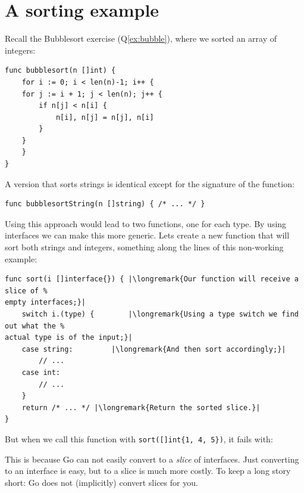 \section{A sorting example}
\label{sec:a sorting example}
Recall the Bubblesort exercise (Q\ref{ex:bubble}), where we sorted an
array of integers:
\begin{lstlisting}
func bubblesort(n []int) {
    for i := 0; i < len(n)-1; i++ {
	for j := i + 1; j < len(n); j++ {
	    if n[j] < n[i] {
		    n[i], n[j] = n[j], n[i]
	    }
	}
    }
}
\end{lstlisting}
A version that sorts strings is identical except for the signature of
the function:
\begin{lstlisting}
func bubblesortString(n []string) { /* ... */ }
\end{lstlisting}
Using this approach would lead to two functions, one for each type. By using
interfaces we can make this more  generic.
Lets create a new function that will sort both strings and
integers, something along the lines of this non-working example:
\begin{lstlisting}
func sort(i []interface{}) { |\longremark{Our function will receive a slice of %
empty interfaces;}|
    switch i.(type) {        |\longremark{Using a type switch we find out what the %
actual type is of the input;}|
	case string:         |\longremark{And then sort accordingly;}|
	    // ...
	case int:
	    // ...
    }
    return /* ... */ |\longremark{Return the sorted slice.}|
}
\end{lstlisting}
\showremarks
But when we call this function with \lstinline|sort([]int{1, 4, 5})|, it
fails with:

This is because Go can not easily convert to a \emph{slice} of interfaces.
Just converting to an interface is easy, but to a slice is much more costly.
To keep a 
long story short: Go does not (implicitly) convert slices for you.

